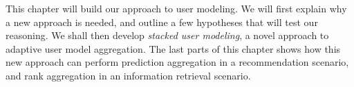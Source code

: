 This chapter will build our approach to user modeling.
We will first explain why a new approach is needed,
and outline a few hypotheses that will test our reasoning.
We shall then develop \emph{stacked user modeling},
a novel approach to adaptive user model aggregation.
The last parts of this chapter shows how this new approach
can perform prediction aggregation in a recommendation scenario,
and rank aggregation in an information retrieval scenario.






